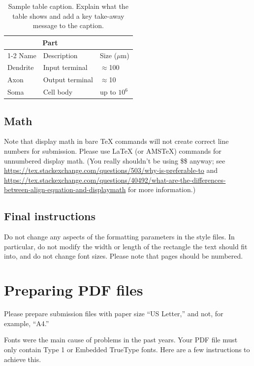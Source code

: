 \documentclass{article}
\begin{document}
\begin{table}
  \caption{Sample table caption. Explain what the table shows and add a key take-away message to the caption.}
  \label{sample-table}
  \centering
  \begin{tabular}{lll}
    \toprule
    \multicolumn{2}{c}{Part}                   \\
    \cmidrule(r){1-2}
    Name     & Description     & Size ($\mu$m) \\
    \midrule
    Dendrite & Input terminal  & $\approx$100  \\
    Axon     & Output terminal & $\approx$10   \\
    Soma     & Cell body       & up to $10^6$  \\
    \bottomrule
  \end{tabular}
\end{table}

\subsection{Math}
Note that display math in bare TeX commands will not create correct line numbers for submission. Please use LaTeX (or AMSTeX) commands for unnumbered display math. (You really shouldn't be using \$\$ anyway; see \url{https://tex.stackexchange.com/questions/503/why-is-preferable-to} and \url{https://tex.stackexchange.com/questions/40492/what-are-the-differences-between-align-equation-and-displaymath} for more information.)

\subsection{Final instructions}

Do not change any aspects of the formatting parameters in the style files.  In
particular, do not modify the width or length of the rectangle the text should
fit into, and do not change font sizes. Please note that pages should be
numbered.


\section{Preparing PDF files}


Please prepare submission files with paper size ``US Letter,'' and not, for
example, ``A4.''


Fonts were the main cause of problems in the past years. Your PDF file must only
contain Type 1 or Embedded TrueType fonts. Here are a few instructions to
achieve this.
\end{document}
